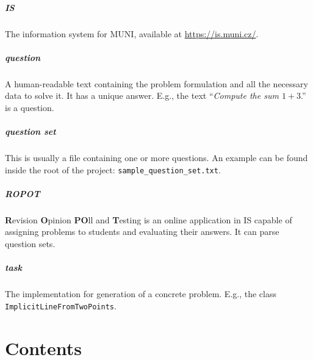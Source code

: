 \documentclass[
  digital, %
  table,   %
  twoside, %
  nolof,     %
  nolot,     %
  draft=false,
  final,
]{fithesis3}
\begin{document}
\paragraph{IS}

The information system for MUNI, available at \href{https://is.muni.cz/}{https://is.muni.cz/}.

\paragraph{question}

A human-readable text containing the problem formulation and all the necessary data to solve it. It has a unique answer. E.g., the text ``\textit{Compute the sum $1 + 3$}.'' is a question.


\paragraph{question set}

This is usually a file containing one or more questions. An example can be found inside the root of the project: \newline \verb|sample_question_set.txt|.

\paragraph{ROPOT}

\textbf{R}evision \textbf{O}pinion \textbf{PO}ll and \textbf{T}esting is an online application in IS capable of assigning problems to students and evaluating their answers. It can parse question sets.


\paragraph{task}

The implementation for generation of a concrete problem. E.g., the class \verb|ImplicitLineFromTwoPoints|.


\appendix




\chapter{Contents}
\end{document}
